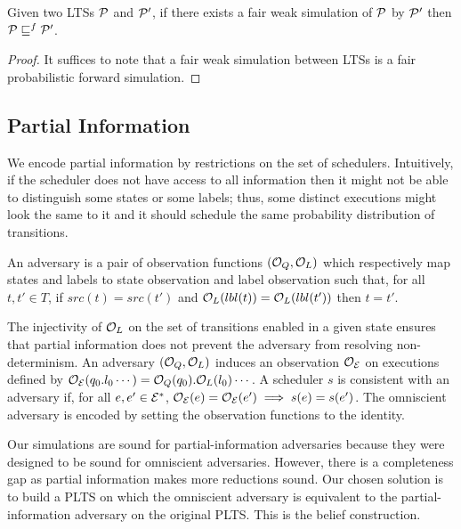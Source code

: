 \begin{lemma}
    \label{lem:fairweaksim}
    Given two LTSs $\mathcal{P}$ and $\mathcal{P}'$, if there exists a fair weak simulation of $\mathcal{P}$ by 
    $\mathcal{P}'$ then $\mathcal{P} \sqsubseteq^f \mathcal{P}'$.
\end{lemma}
\begin{proof}
    It suffices to note that a fair weak simulation between LTSs is a fair probabilistic forward
    simulation.
\end{proof}

\subsection{Partial Information}

We encode partial information by restrictions on the set of schedulers.
Intuitively, if the scheduler does not have access to all information then it might
not be able to distinguish some states or some labels; thus, some distinct
executions might look the same to it and it should schedule the same
probability distribution of transitions.

\begin{definition}[Adversary]
    An adversary is a pair of observation functions $(\mathcal{O}_Q, \mathcal{O}_L)$ which
    respectively map states and labels to state observation and label observation
    such that, for all $t,t' \in T$, if $src(t) = src(t')$ and
    $\mathcal{O}_L(lbl(t)) = \mathcal{O}_L(lbl(t'))$ then $t = t'$.
\end{definition}

The injectivity of $\mathcal{O}_L$ on the set of transitions enabled in a given
state ensures that partial information does not prevent the adversary from resolving
non-determinism. An adversary $(\mathcal{O}_Q,\mathcal{O}_L)$ induces an observation $\mathcal{O}_{\mathcal{E}}$
on executions defined by
$\mathcal{O}_{\mathcal{E}}(q_0.l_0\cdots) = \mathcal{O}_Q(q_0).\mathcal{O}_L(l_0)\cdots$.
A scheduler $s$ is consistent with an adversary if, for all $e,e' \in \mathcal{E}^*$,
$\mathcal{O}_{\mathcal{E}}(e) = \mathcal{O}_{\mathcal{E}}(e') \implies s(e) = s(e')$. The omniscient adversary
is encoded by setting the observation functions to the identity.

Our simulations are sound for partial-information adversaries because they were
designed to be sound for omniscient adversaries. However, there is a completeness
gap as partial information makes more reductions sound. Our chosen solution is to
build a PLTS on which the omniscient adversary is equivalent to the
partial-information adversary on the original PLTS. This is the belief construction.


